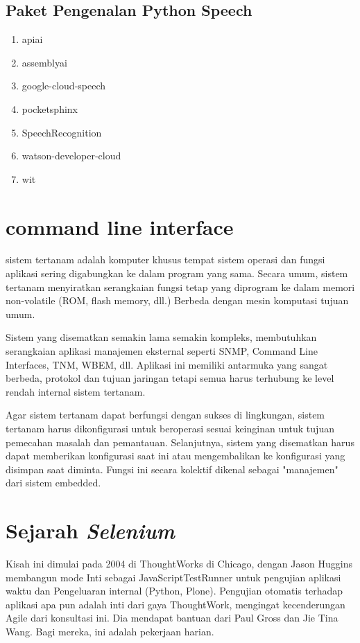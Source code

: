 \subsection{Paket Pengenalan Python Speech}
\begin{enumerate}
    \item apiai
    \item assemblyai
    \item google-cloud-speech
    \item pocketsphinx
    \item SpeechRecognition
    \item watson-developer-cloud
    \item wit
\end{enumerate}
\section{command line interface}
\par sistem tertanam adalah komputer khusus tempat sistem operasi dan fungsi aplikasi sering digabungkan ke dalam program yang sama. Secara umum, sistem tertanam menyiratkan serangkaian fungsi tetap yang diprogram ke dalam memori non-volatile (ROM, flash memory, dll.) Berbeda dengan mesin komputasi tujuan umum.

\par Sistem yang disematkan semakin lama semakin kompleks, membutuhkan serangkaian aplikasi manajemen eksternal seperti SNMP, Command Line Interfaces, TNM, WBEM, dll. Aplikasi ini memiliki antarmuka yang sangat berbeda, protokol dan tujuan jaringan tetapi semua harus terhubung ke level rendah internal sistem tertanam.

\par Agar sistem tertanam dapat berfungsi dengan sukses di lingkungan, sistem tertanam harus dikonfigurasi untuk beroperasi sesuai keinginan untuk tujuan pemecahan masalah dan pemantauan. Selanjutnya, sistem yang disematkan harus dapat memberikan konfigurasi saat ini atau mengembalikan ke konfigurasi yang disimpan saat diminta. Fungsi ini secara kolektif dikenal sebagai "manajemen" dari sistem embedded.
\section{Sejarah \textit{Selenium}}
\par Kisah ini dimulai pada 2004 di ThoughtWorks di Chicago, dengan Jason Huggins membangun mode Inti sebagai JavaScriptTestRunner untuk pengujian aplikasi waktu dan Pengeluaran internal (Python, Plone). Pengujian otomatis terhadap aplikasi apa pun adalah inti dari gaya ThoughtWork, mengingat kecenderungan Agile dari konsultasi ini. Dia mendapat bantuan dari Paul Gross dan Jie Tina Wang. Bagi mereka, ini adalah pekerjaan harian.

